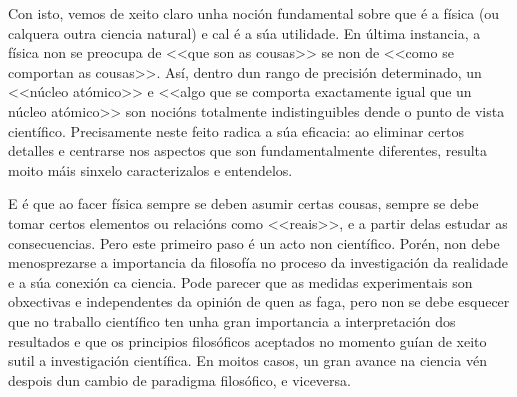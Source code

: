\begin{multicols}{2}
Con isto, vemos de xeito claro unha noción fundamental sobre que é a física (ou
calquera outra ciencia natural) e cal é a súa utilidade. En última instancia, a
física non se preocupa de <<que son as cousas>> se non de <<como se comportan
as cousas>>. Así, dentro dun rango de precisión determinado, un <<núcleo
atómico>> e <<algo que se comporta exactamente igual que un núcleo atómico>>
son nocións totalmente indistinguibles dende o punto de vista científico.
Precisamente neste feito radica a súa eficacia: ao eliminar certos detalles e
centrarse nos aspectos que son fundamentalmente diferentes, resulta moito máis
sinxelo caracterizalos e entendelos.

E é que ao facer física sempre se deben asumir certas cousas, sempre se debe
tomar certos elementos ou relacións como <<reais>>, e a partir delas estudar as
consecuencias. Pero este primeiro paso é un acto non científico. Porén, non
debe menosprezarse a importancia da filosofía no proceso da investigación da
realidade e a súa conexión ca ciencia. Pode parecer que as medidas
experimentais son obxectivas e independentes da opinión de quen as faga, pero
non se debe esquecer que no traballo científico ten unha gran importancia a
interpretación dos resultados e que os principios filosóficos aceptados no
momento guían de xeito sutil a investigación científica. En moitos casos, un
gran avance na ciencia vén despois dun cambio de paradigma filosófico, e
viceversa.

\end{multicols}
